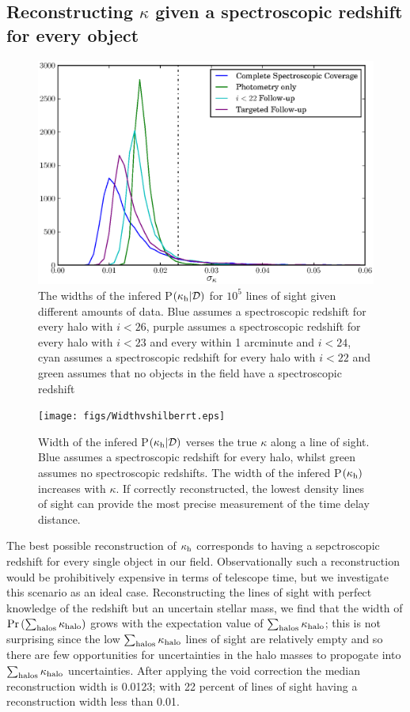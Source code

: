 \documentclass[useAMS,usenatbib]{mn2e}
\begin{document}
\subsection{Reconstructing $\kappa$ given a spectroscopic redshift for every object}

\begin{figure}
\includegraphics[width=\columnwidth]{figs/Width.eps}
\caption[magcut]{The widths of the infered P$(\kappa_{\rm h}|\mathcal{D})$ for $10^5$ lines of sight given different amounts of data. Blue assumes a spectroscopic redshift for every halo with $i<26$, purple assumes a spectroscopic redshift for every halo with $i<23$ and every within 1 arcminute and $i<24$, cyan assumes a spectroscopic redshift for every halo with $i<22$ and green assumes that no objects in the field have a spectroscopic redshift}
\label{fig:reconwidths}
\end{figure}

\begin{figure}
\texttt{[image: figs/Widthvshilberrt.eps]}
\caption[magcut]{Width of the infered P$(\kappa_{\rm h}|\mathcal{D})$ verses the true $\kappa$ along a line of sight. Blue assumes a spectroscopic redshift for every halo, whilst green assumes no spectroscopic redshifts. The width of the infered P$(\kappa_{\rm h})$ increases with $\kappa$. If correctly reconstructed, the lowest density lines of sight can provide the most precise measurement of the time delay distance.}
\label{fig:widthsvsH}
\end{figure}

The best possible reconstruction of $\kappa_{\rm h}$ corresponds to having a sepctroscopic redshift for every single object in our field. Observationally such a reconstruction would be prohibitively expensive in terms of telescope time, but we investigate this scenario as an ideal case. Reconstructing the lines of sight with perfect knowledge of the redshift but an uncertain stellar mass, we find that the width of ${\rm Pr}\left(\sum_{\rm halos} \kappa_{\rm halo} \right)$ grows with the expectation value of $\sum_{\rm halos} \kappa_{\rm halo}$; this is not surprising since the low $\sum_{\rm halos} \kappa_{\rm halo}$ lines of sight are relatively empty and so there are few opportunities for uncertainties in the halo masses to propogate into $\sum_{\rm halos} \kappa_{\rm halo}$ uncertainties. After applying the void correction the median reconstruction width is 0.0123; with 22 percent of lines of sight having a reconstruction width less than 0.01. 
\end{document}
